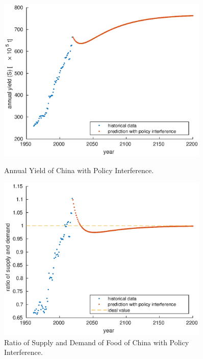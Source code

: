 \documentclass[12pt]{article}
\begin{document}
\begin{figure}[htbp]
    \centering
    \begin{minipage}[t]{0.48\textwidth}
        \centering
        \includegraphics[width=0.9\textwidth]{figure/model/China/China_yield.eps}
        \caption{Annual Yield of China with Policy Interference.\label{fig:China_yield}}
    \end{minipage}
    \begin{minipage}[t]{0.48\textwidth}
        \centering
        \includegraphics[width=0.9\textwidth]{figure/model/China/China_equity.eps}
        \caption{Ratio of Supply and Demand of Food of China with Policy Interference.\label{fig:China_equity}}
    \end{minipage}
\end{figure}
\end{document}
